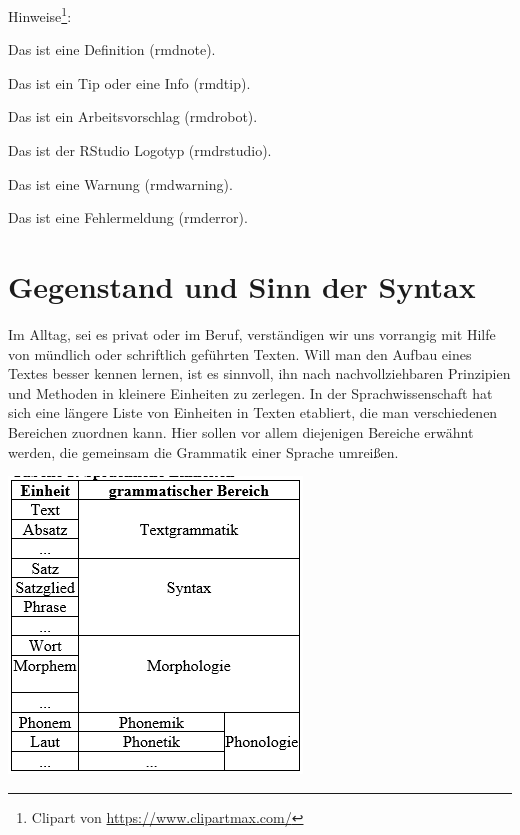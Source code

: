 \documentclass[
]{article}
\begin{document}
Hinweise\footnote{Clipart von \url{https://www.clipartmax.com/}}:

Das ist eine Definition (rmdnote).

Das ist ein Tip oder eine Info (rmdtip).

Das ist ein Arbeitsvorschlag (rmdrobot).

Das ist der RStudio Logotyp (rmdrstudio).

Das ist eine Warnung (rmdwarning).

Das ist eine Fehlermeldung (rmderror).

\hypertarget{gegenstand-und-sinn-der-syntax}{%
\section{Gegenstand und Sinn der Syntax}\label{gegenstand-und-sinn-der-syntax}}

Im Alltag, sei es privat oder im Beruf, verständigen wir uns vorrangig mit Hilfe von mündlich oder schriftlich geführten Texten. Will man den Aufbau eines Textes besser kennen lernen, ist es sinnvoll, ihn nach nachvollziehbaren Prinzipien und Methoden in kleinere Einheiten zu zerlegen. In der Sprachwissenschaft hat sich eine längere Liste von Einheiten in Texten etabliert, die man verschiedenen Bereichen zuordnen kann. Hier sollen vor allem diejenigen Bereiche erwähnt werden, die gemeinsam die Grammatik einer Sprache umreißen.

\includegraphics[width=1\linewidth]{pictures/grammatische_bereiche}
\end{document}
